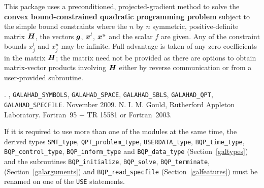 \documentclass{galahad}
\newcommand{\packagename}{BQP}
\newcommand{\fullpackagename}{\libraryname\_\packagename}
\begin{document}
\galheader


\galsummary
This package uses a preconditioned, projected-gradient method
to solve the {\bf convex bound-constrained quadratic programming problem}
subject to the simple bound constraints
where the $n$ by $n$ symmetric, positive-definite matrix ${\bm{H}}$, the 
vectors ${\bm{g}}$, ${\bm{x}}^{l}$, ${\bm{x}}^{u}$ and the scalar $f$ are given.
Any of the constraint bounds $x_{j}^{l}$ and $x_{j}^{u}$ may be infinite.
Full advantage is taken of any zero coefficients in the matrix ${\bm{H}}$;
the matrix need not be provided as there are options to obtain matrix-vector
products involving ${\bm{H}}$ either by reverse communication or from a 
user-provided subroutine.


\galattributes
\galversions{\tt  \fullpackagename\_single, \fullpackagename\_double}.
,
{\tt GALAHAD\_SY\-M\-BOLS}, 
{\tt GALAHAD\-\_\-SPACE}, 
{\tt GALAHAD\_SBLS},
{\tt GALAHAD\_QPT},
{\tt GALAHAD\_SPECFILE}.
\galdate November 2009.
\galorigin N. I. M. Gould, Rutherford Appleton Laboratory.
\gallanguage Fortran~95 + TR 15581 or Fortran~2003. 


\galhowto




\noindent
If it is required to use more than one of the modules at the same time, 
the derived types
{\tt SMT\_type}, 
{\tt QPT\_problem\_type}, 
{\tt USERDATA\-\_type},
{\tt \packagename\_time\_type}, 
{\tt \packagename\_control\_type}, 
{\tt \packagename\_inform\_type} 
and
{\tt \packagename\_data\_type}
(Section~\ref{galtypes})
and the subroutines
{\tt \packagename\_initialize}, 
{\tt \packagename\_\-solve},
{\tt \packagename\_terminate},
(Section~\ref{galarguments})
and 
{\tt \packagename\_read\_specfile}
(Section~\ref{galfeatures})
must be renamed on one of the {\tt USE} statements.

\end{document}
